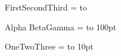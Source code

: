\documentclass{article}
\begin{document}
\vbox{\null{} \hbox{First}\hbox{Second}\hbox{Third}}
= to\baselineskip
{}

\vbox{\hbox{Alpha} \hbox{Beta}\hbox{Gamma}}
= to 100pt
\par{}

\vbox{\hbox{One}\nobreak\hbox{Two}\hbox{Three}}
= to 10pt
\end{document}
